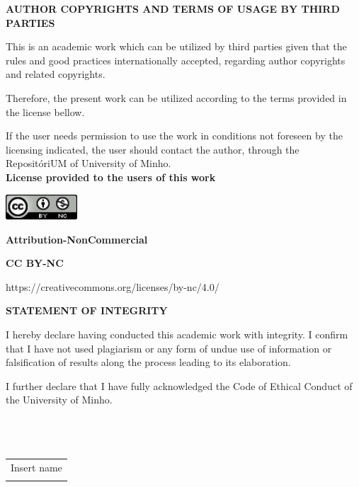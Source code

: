 
        \begin{center}
            \textbf{AUTHOR COPYRIGHTS AND TERMS OF USAGE BY THIRD PARTIES}
        \end{center}

        This is an academic work which can be utilized by third parties given that the rules and good practices internationally accepted, regarding author copyrights and related copyrights.

        Therefore, the present work can be utilized according to the terms provided in the license bellow.

        If the user needs permission to use the work in conditions not foreseen by the licensing indicated, the user should contact the author, through the RepositóriUM of University of Minho.\\[0.5cm]

        \textbf{License provided to the users of this work}

        \includegraphics[width=0.2\textwidth]{images/license.png}

        \textbf{Attribution-NonCommercial}

        \textbf{CC BY-NC}

        https://creativecommons.org/licenses/by-nc/4.0/

        \newpage
        \begin{center}
            \textbf{STATEMENT OF INTEGRITY}
        \end{center}
        I hereby declare having conducted this academic work with integrity. I confirm that I have not used plagiarism or any form of undue use of information or falsification of results along the process leading to its elaboration.

        I further declare that I have fully acknowledged the Code of Ethical Conduct of the University of Minho.\\\\\\\\

\begin{flushright}
\begin{tabular}{@{}p{2.5in}}
Insert name\\
\hrulefill \\
\end{tabular}
\end{flushright}